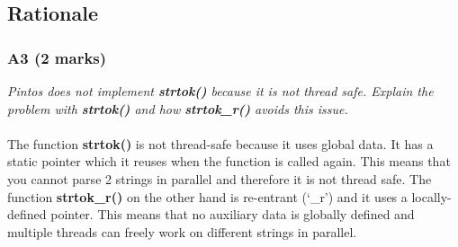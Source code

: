 \documentclass{report}
\newcommand{\question}[1]{\textit{#1} \ }
\newcommand{\fun}[1]{\textcolor{Emerald}{\textbf{#1}}}
\begin{document}
        \subsection*{Rationale}
            \subsubsection*{A3 (2 marks)}
                \question{Pintos does not implement \fun{strtok()} because it is not thread safe. Explain the problem with \fun{strtok()} 
                and how \fun{strtok\_r()} avoids this issue.}
                \\
                \\The function \fun{strtok()} is not thread-safe because it uses global data. It has a static pointer which it reuses when 
								the function is called again. This means that you cannot parse 2 strings in parallel and therefore it is not thread safe. 
								The function \fun{strtok\_r()} on the other hand is re-entrant (‘\_r’) and it uses a locally-defined pointer. This means that 
								no auxiliary data is globally defined and multiple threads can freely work on different strings in parallel.
\end{document}

